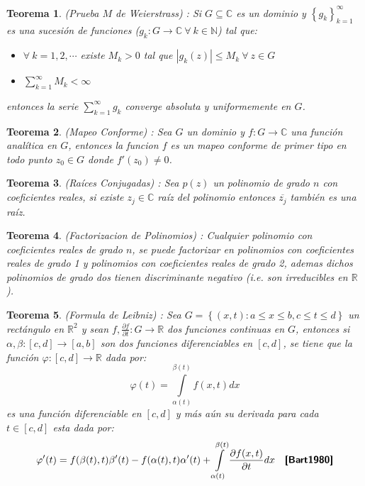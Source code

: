 \documentclass[spanish, openright,oneside]{book}
\newtheorem{teo}{Teorema}[chapter]
\theoremstyle{definition}
\begin{document}
\begin{teo}\label{MWei}{(Prueba $M$ de Weierstrass)} :
Si $G \subseteq \mathbb{C}$ es un dominio y $\left\{g_k \right\}_{k=1}^{\infty}$ es una sucesión de funciones ($g_k: G \rightarrow \mathbb{C} \ \forall \ k \in \mathbb{N}$) tal que:
\begin{itemize}
\item[i)] $\forall \  k=1, 2,\cdots$ existe $M_k>0$ tal que $|g_k(z)| \leq M_k \ \forall \ z \in G$
\item[ii)]$ \sum \limits_{k=1}^{\infty} M_k < \infty$
\end{itemize}
entonces la serie $\displaystyle\sum \limits_{k=1}^{\infty} g_k$ converge absoluta y uniformemente en $G$. \ \ \ \textbf{\textsf{\cite{marsd1996}}}  
\end{teo}

\begin{teo}\label{mapcon}{(Mapeo Conforme)} :
Sea $G$ un dominio y $f: G \rightarrow \mathbb{C} $ una función analítica en $G$, entonces la funcion $f$ es un mapeo conforme de primer tipo en todo punto $z_0 \in G$ donde $f'(z_0)\neq 0$. \ \ \ \textbf{\textsf{\cite{marku2005}}}  
\end{teo}

\begin{teo}\label{Rconj}{(Raíces Conjugadas)} :
Sea $p(z)$ un polinomio de grado $n$ con coeficientes reales, si existe $z_j \in \mathbb{C}$ raíz del polinomio entonces $\overline{z_j}$ también es una raíz.\ \ \ \textbf{\textsf{\cite{birk1977}}}  
\end{teo}

\begin{teo}\label{PolDes}{(Factorizacion de Polinomios)} :
Cualquier polinomio con coeficientes reales de grado $n$, se puede factorizar en polinomios con coeficientes reales de grado 1 y polinomios con coeficientes reales de grado 2, ademas dichos polinomios de grado dos tienen discriminante negativo (i.e. son irreducibles en $\mathbb{R}$). \ \ \ \textbf{\textsf{\cite{birk1977}}}  
\end{teo}

\begin{teo}\label{forlei}{(Formula de Leibniz)} :
Sea $G=\left\{(x,t):a\leq x \leq b, c \leq t \leq d\right\}$ un rectángulo en $\mathbb{R}^2$ y sean  $ \displaystyle f, \frac{\partial f}{\partial t}: G \rightarrow \mathbb{R} $ dos funciones continuas en $G$, entonces si $\alpha, \beta : [c,d] \rightarrow [a,b]$ son dos funciones diferenciables en $[c,d]$, se tiene que la función $\varphi:[c,d]\rightarrow \mathbb{R}$ dada por:
\[
\varphi(t)=\int\limits_{\alpha(t)}^{\beta(t)}f(x,t)dx
\] 
es una función diferenciable en $[c,d]$ y más aún su derivada para cada $t \in [c,d] $ esta dada por:
\[
\varphi'(t) = f(\beta(t),t)\beta'(t)-f(\alpha(t),t)\alpha'(t)+ \int\limits_{\alpha(t)}^{\beta(t)}\frac{\partial f(x,t)}{\partial t}dx\ \ \ \textbf{\textsf{\cite{Bart1980}}}  
 \]
\end{teo}
\label{C^}
\nocite{*}

\cleardoublepage
{}


\end{document}

